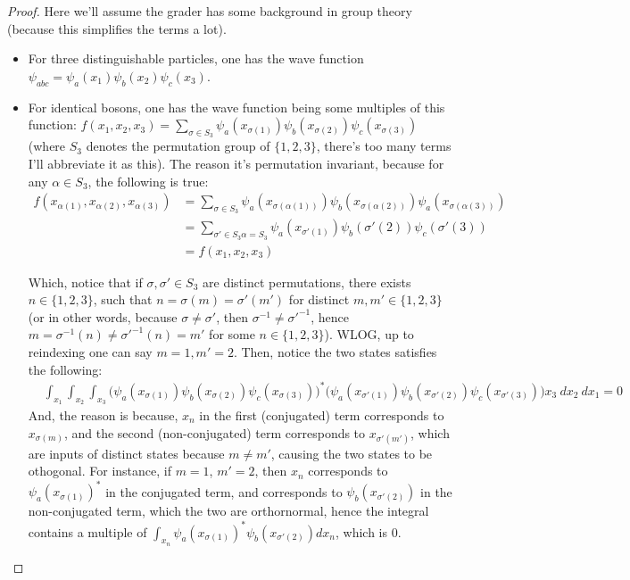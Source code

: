 \documentclass{article}
\begin{document}
\begin{proof}
    
    Here we'll assume the grader has some background in group theory (because this simplifies the terms a lot).

    \begin{itemize}
        \item[(a)] For three distinguishable particles, one has the wave function $\psi_{abc} = \psi_a(x_1)\psi_b(x_2)\psi_c(x_3)$.
        
        \hfil

        \item[(b)] For identical bosons, one has the wave function being some multiples of this function: $f(x_1,x_2,x_3)=\sum_{\sigma\in S_3}\psi_a(x_{\sigma(1)})\psi_b(x_{\sigma(2)})\psi_c(x_{\sigma(3)})$ (where $S_3$ denotes the permutation group of $\{1,2,3\}$, there's too many terms I'll abbreviate it as this). The reason it's permutation invariant, because for any $\alpha \in S_3$, the following is true:
        \begin{align}
            f(x_{\alpha(1)},x_{\alpha(2)},x_{\alpha(3)})&= \sum_{\sigma \in S_3}\psi_a(x_{\sigma(\alpha(1))})\psi_b(x_{\sigma(\alpha(2))})\psi_a(x_{\sigma(\alpha(3))})\\
            &= \sum_{\sigma' \in S_3\alpha = S_3}\psi_a(x_{\sigma'(1)})\psi_b(\sigma'(2))\psi_c(\sigma'(3))\\
            &= f(x_1,x_2,x_3)
        \end{align}
        
        Which, notice that if $\sigma,\sigma'\in S_3$ are distinct permutations, there exists $n \in \{1,2,3\}$, such that $n = \sigma(m)=\sigma'(m')$ for distinct $m,m'\in\{1,2,3\}$ (or in other words, because $\sigma\neq \sigma'$, then $\sigma^{-1}\neq \sigma'^{-1}$, hence $m=\sigma^{-1}(n)\neq \sigma'^{-1}(n)=m'$ for some $n\in\{1,2,3\}$). WLOG, up to reindexing one can say $m=1, m'=2$. Then, notice the two states satisfies the following:
        \begin{align}
            &\int_{x_1}\int_{x_2}\int_{x_3}\big(\psi_a(x_{\sigma(1)})\psi_b(x_{\sigma(2)})\psi_c(x_{\sigma(3)})\big)^* \big(\psi_a(x_{\sigma'(1)})\psi_b(x_{\sigma'(2)})\psi_c(x_{\sigma'(3)})\big)x_3\ dx_2\ dx_1=0
        \end{align}
        And, the reason is because, $x_n$ in the first (conjugated) term corresponds to $x_{\sigma(m)}$, and the second (non-conjugated) term corresponds to $x_{\sigma'(m')}$, which are inputs of distinct states because $m\neq m'$, causing the two states to be othogonal. For instance, if $m=1$, $m'=2$, then $x_n$ corresponds to $\psi_a(x_{\sigma(1)})^*$ in the conjugated term, and corresponds to $\psi_b(x_{\sigma'(2)})$ in the non-conjugated term, which the two are orthornormal, hence the integral contains a multiple of $\int_{x_n}\psi_a(x_{\sigma(1)})^*\psi_b(x_{\sigma'(2)}) dx_n$, which is $0$.


\end{itemize}
\end{proof}
\end{document}
